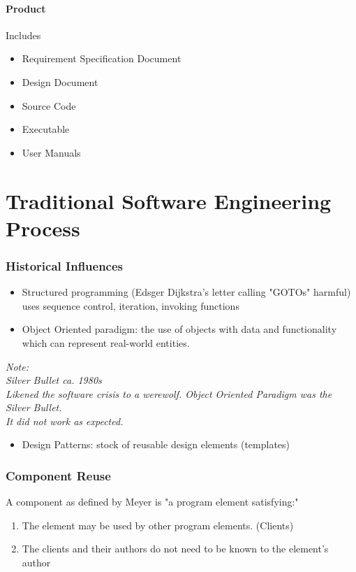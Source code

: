 \documentclass{report}
\begin{document}
		\subsubsection{Product}
			Includes
			\begin{itemize}
				\item Requirement Specification Document
				\item Design Document
				\item Source Code
				\item Executable
				\item User Manuals
			\end{itemize}
	\chapter{Traditional Software Engineering Process}
		\subsection{Historical Influences}
			\begin{itemize}
				\item Structured programming (Edsger Dijkstra's letter calling "GOTOs" harmful) uses sequence control, iteration, invoking functions
				\item Object Oriented paradigm: the use of objects with data and functionality which can represent real-world entities.
			\end{itemize}
			\textit{Note:\\Silver Bullet ca. 1980s\\ Likened the software crisis to a werewolf.  Object Oriented Paradigm was the Silver Bullet.\\It did not work as expected.}
			\begin{itemize}
				\item Design Patterns: stock of reusable design elements (templates)
			\end{itemize}
		\subsection{Component Reuse}
			A component as defined by Meyer is "a program element satisfying:"
			\begin{enumerate}
				\item The element may be used by other program elements. (Clients)
				\item The clients and their authors do not need to be known to the element's author
			\end{enumerate}
\end{document}
